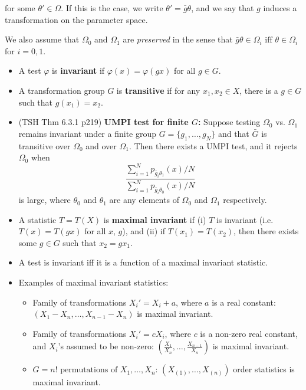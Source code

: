 \documentclass[twoside]{article}
\newcommand\Om{\Omega}
\def\t{\theta}
\begin{document}
for some $\t' \in \Om$. If this is the case, we write $\t' = \bar{g}\t$, and we say that $g$ induces a transformation on the parameter space.

We also assume that $\Om_0$ and $\Om_1$ are \textit{preserved} in the sense that $\bar{g}\t \in \Om_i \text{ iff } \t \in \Om_i$ for $i = 0,1$.

\begin{itemize}
\item A test $\varphi$ is \textbf{invariant} if $\varphi(x) = \varphi(gx)$ for all $g \in G$.

\item A transformation group $G$ is \textbf{transitive} if for any $x_1, x_2 \in X$, there is a $g \in G$ such that $g(x_1) = x_2$.

\item (TSH Thm 6.3.1 p219) \textbf{UMPI test for finite $G$:} Suppose testing $\Om_0$ vs. $\Om_1$ remains invariant under a finite group $G = \{ g_1, \dots, g_N\}$ and that $\bar{G}$ is transitive over $\Om_0$ and over $\Om_1$. Then there exists a UMPI test, and it rejects $\Om_0$ when
\[ \frac{\sum_{i=1}^N p_{\bar{g}_i \t_1}(x) / N}{\sum_{i=1}^N p_{\bar{g}_i \t_0}(x) / N} \]
is large, where $\t_0$ and $\t_1$ are any elements of $\Om_0$ and $\Om_1$ respectively.

\item A statistic $T = T(X)$ is \textbf{maximal invariant} if (i) $T$ is invariant (i.e. $T(x) = T(gx)$ for all $x$, $g$), and (ii) if $T(x_1) = T(x_2)$, then there exists some $g \in G$ such that $x_2 = gx_1$.

\item A test is invariant iff it is a function of a maximal invariant statistic.

\item Examples of maximal invariant statistics:
\begin{itemize}
\item Family of transformations $X_i' = X_i + a$, where $a$ is a real constant: $(X_1 - X_n, \dots, X_{n-1} - X_n)$ is maximal invariant.

\item Family of transformations $X_i' = cX_i$, where $c$ is a non-zero real constant, and $X_i$'s assumed to be non-zero: $\left(\displaystyle\frac{X_1}{X_n}, \dots, \frac{X_{n-1}}{X_n} \right)$ is maximal invariant.

\item $G = n! \text{ permutations of } X_1, \dots, X_n$: $(X_{(1)}, \dots, X_{(n)})$ order statistics is maximal invariant.


\end{itemize}
\end{itemize}
\end{document}
